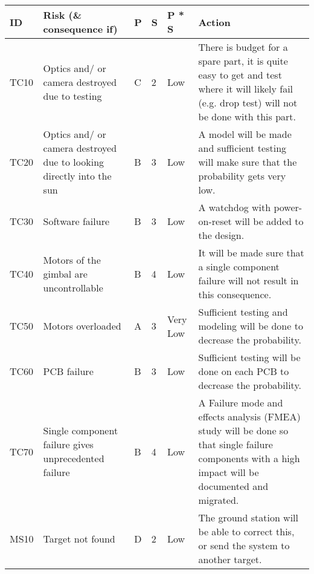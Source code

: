 

\begin{longtable}{|m{}| m{} |m{} |m{}|m{}| m{}|}

\hline
\textbf{ID} & \textbf{Risk (\& consequence if)} & \textbf{P} & \textbf{S} & \textbf{P * S} & \textbf{Action} \\ \hline


TC10 & Optics and/ or camera destroyed due to testing						& C & 2 & \cellcolor[HTML]{FCFF2F}Low 		& There is budget for a spare part, it is quite easy to get and test where it will likely fail (e.g. drop test) will not be done with this part.\\\hline

TC20 & Optics and/ or camera destroyed due to looking directly into the sun & B & 3 & \cellcolor[HTML]{FCFF2F}Low 		& A model will be made and sufficient testing will make sure that the probability gets very low.\\\hline

TC30 & Software failure														& B & 3 & \cellcolor[HTML]{FCFF2F}Low 		& A watchdog with power-on-reset will be added to the design.\\\hline

TC40 & Motors of the gimbal are uncontrollable								& B & 4 & \cellcolor[HTML]{FCFF2F}Low 		& It will be made sure that a single component failure will not result in this consequence.\\\hline

TC50 & Motors overloaded													& A & 3 & \cellcolor[HTML]{34FF34}Very Low 	& Sufficient testing and modeling will be done to decrease the probability.\\\hline

TC60 & PCB failure															& B & 3 & \cellcolor[HTML]{FCFF2F}Low 		& Sufficient testing will be done on each PCB to decrease the probability.\\\hline

TC70 & Single component failure gives unprecedented failure					& B & 4 & \cellcolor[HTML]{FCFF2F}Low			& A Failure mode and effects analysis (FMEA) study will be done so that single failure components with a high impact will be documented and migrated.\\\hline


MS10 & Target not found														& D & 2 & \cellcolor[HTML]{FCFF2F}Low			& The ground station will be able to correct this, or send the system to another target.\\\hline


\end{longtable}
